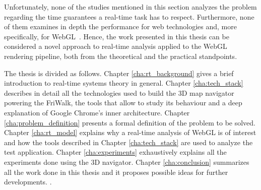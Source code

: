 Unfortunately, none of the studies mentioned in this section analyzes the problem
regarding the time guarantees a real-time task has to respect. Furthermore, none of them
examines in depth the performance for web technologies and, more specifically,
for WebGL~\cite{webgl}. Hence, the work presented in this thesis can be considered
a novel approach to real-time analysis applied to the WebGL rendering pipeline,
both from the theoretical and the practical standpoints.

The thesis is divided as follows. Chapter \ref{cha:rt_background}
gives a brief introduction to real-time systems theory in general. Chapter
\ref{cha:tech_stack} describes in detail all the technologies used to build the
3D map navigator powering the FriWalk, the tools that allow to study its
behaviour and a deep explanation of Google Chrome's
inner architecture. Chapter \ref{cha:problem_definition} presents a formal definition
of the problem to be solved. Chapter \ref{cha:rt_model}
explains why a real-time analysis of WebGL is of interest and how the tools
described in Chapter \ref{cha:tech_stack} are used to analyze the test application.
Chapter \ref{cha:experiments} exhaustively explains all the experiments done using
the 3D navigator. Chapter \ref{cha:conclusion} summarizes all the work
done in this thesis and it proposes possible ideas for further developments.
.
